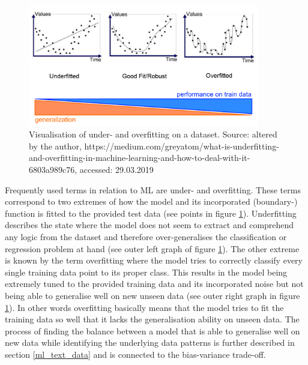 \begin{figure}[!htb]
   \centering
   \includegraphics[width=0.9\textwidth]{img/over_underfitting}
   \caption{Visualisation of under- and overfitting on a dataset. Source: altered by the author, https://medium.com/greyatom/what-is-underfitting-and-overfitting-in-machine-learning-and-how-to-deal-with-it-6803a989c76, accessed: 29.03.2019}
   \label{fig:over_underfitting}
\end{figure}

\clearpage

Frequently used terms in relation to ML are under- and overfitting. These terms correspond to two extremes of how the model and its incorporated (boundary-) function is fitted to the provided test data (see points in figure \ref{fig:over_underfitting}). Underfitting describes the state where the model does not seem to extract and comprehend any logic from the dataset and therefore over-generalises the classification or regression problem at hand (see outer left graph of figure \ref{fig:over_underfitting}). The other extreme is known by the term overfitting where the model tries to correctly classify every single training data point to its proper class. This results in the model being extremely tuned to the provided training data and its incorporated noise but not being able to generalise well on new unseen data (see outer right graph in figure \ref{fig:over_underfitting}). In other words overfitting basically means that the model tries to fit the training data so well that it lacks the generalisation ability on unseen data. The process of finding the balance between a model that is able to generalise well on new data while identifying the underlying data patterns is further described in section \ref{ml_text_data} and is connected to the bias-variance trade-off.